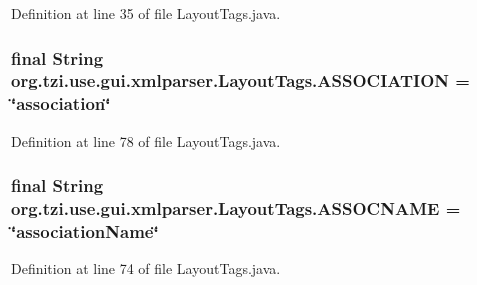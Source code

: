 Definition at line 35 of file Layout\-Tags.\-java.

\hypertarget{classorg_1_1tzi_1_1use_1_1gui_1_1xmlparser_1_1_layout_tags_a5c756ec1a155b335f202f35f2391a4f2}{
\subsubsection[{A\-S\-S\-O\-C\-I\-A\-T\-I\-O\-N}]{\setlength{\rightskip}{0pt plus 5cm}final String org.\-tzi.\-use.\-gui.\-xmlparser.\-Layout\-Tags.\-A\-S\-S\-O\-C\-I\-A\-T\-I\-O\-N = \char`\"{}association\char`\"{}\hspace{0.3cm}{\ttfamily [static]}}}\label{classorg_1_1tzi_1_1use_1_1gui_1_1xmlparser_1_1_layout_tags_a5c756ec1a155b335f202f35f2391a4f2}


Definition at line 78 of file Layout\-Tags.\-java.

\hypertarget{classorg_1_1tzi_1_1use_1_1gui_1_1xmlparser_1_1_layout_tags_a440dfb0a9d2385eab2e629ca0589be06}{
\subsubsection[{A\-S\-S\-O\-C\-N\-A\-M\-E}]{\setlength{\rightskip}{0pt plus 5cm}final String org.\-tzi.\-use.\-gui.\-xmlparser.\-Layout\-Tags.\-A\-S\-S\-O\-C\-N\-A\-M\-E = \char`\"{}association\-Name\char`\"{}\hspace{0.3cm}{\ttfamily [static]}}}\label{classorg_1_1tzi_1_1use_1_1gui_1_1xmlparser_1_1_layout_tags_a440dfb0a9d2385eab2e629ca0589be06}


Definition at line 74 of file Layout\-Tags.\-java.

